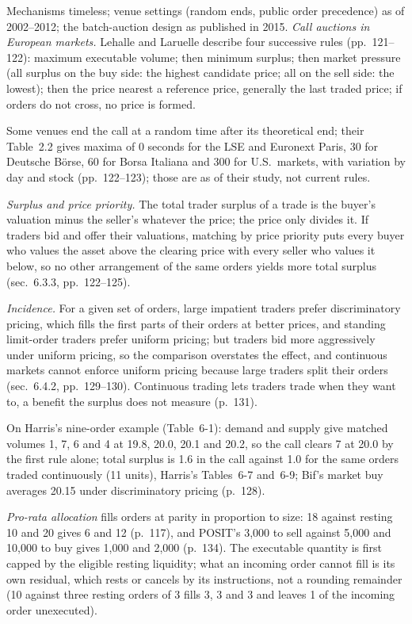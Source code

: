 \begin{qfmechanism}
 Mechanisms timeless; venue settings (random ends, public order precedence) as of 2002--2012; the batch-auction design as published in 2015. \emph{Call auctions in European markets.} Lehalle and Laruelle describe four successive rules (pp.~121--122): maximum executable volume; then minimum surplus; then market pressure (all surplus on the buy side: the highest candidate price; all on the sell side: the lowest); then the price nearest a reference price, generally the last traded price; if orders do not cross, no price is formed.

Some venues end the call at a random time after its theoretical end; their Table~2.2 gives maxima of 0 seconds for the LSE and Euronext Paris, 30 for Deutsche Börse, 60 for Borsa Italiana and 300 for U.S.\ markets, with variation by day and stock (pp.~122--123); those are as of their study, not current rules.

\emph{Surplus and price priority.} The total trader surplus of a trade is the buyer's valuation minus the seller's whatever the price; the price only divides it. If traders bid and offer their valuations, matching by price priority puts every buyer who values the asset above the clearing price with every seller who values it below, so no other arrangement of the same orders yields more total surplus (sec.~6.3.3, pp.~122--125).

\emph{Incidence.} For a given set of orders, large impatient traders prefer discriminatory pricing, which fills the first parts of their orders at better prices, and standing limit-order traders prefer uniform pricing; but traders bid more aggressively under uniform pricing, so the comparison overstates the effect, and continuous markets cannot enforce uniform pricing because large traders split their orders (sec.~6.4.2, pp.~129--130). Continuous trading lets traders trade when they want to, a benefit the surplus does not measure (p.~131).

 On Harris's nine-order example (Table~6-1): demand and supply give matched volumes 1, 7, 6 and 4 at 19.8, 20.0, 20.1 and 20.2, so the call clears 7 at 20.0 by the first rule alone; total surplus is 1.6 in the call against 1.0 for the same orders traded continuously (11 units), Harris's Tables~6-7 and~6-9; Bif's market buy averages 20.15 under discriminatory pricing (p.~128).

\emph{Pro-rata allocation} fills orders at parity in proportion to size: 18 against resting 10 and 20 gives 6 and 12 (p.~117), and POSIT's 3{,}000 to sell against 5{,}000 and 10{,}000 to buy gives 1{,}000 and 2{,}000 (p.~134). The executable quantity is first capped by the eligible resting liquidity; what an incoming order cannot fill is its own residual, which rests or cancels by its instructions, not a rounding remainder (10 against three resting orders of 3 fills 3, 3 and 3 and leaves 1 of the incoming order unexecuted).


\end{qfmechanism}
